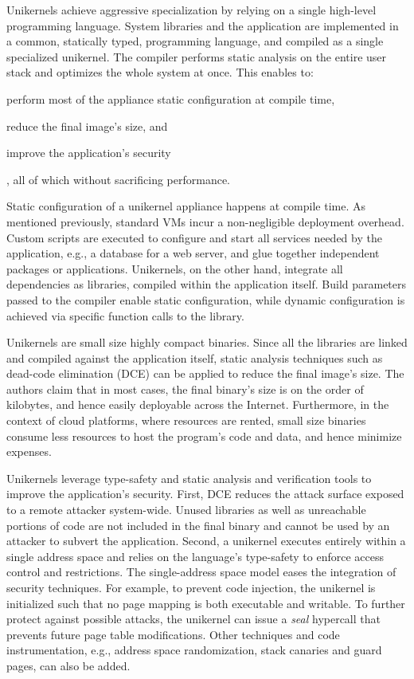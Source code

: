 Unikernels achieve aggressive specialization by relying on a single high-level programming language.
System libraries and the application are implemented in a common, statically typed, programming language, and compiled as a single specialized unikernel.
The compiler performs static analysis on the entire user stack and optimizes the whole system at once.
This enables to:
\begin{enumerate*}
	\item perform most of the appliance static configuration at compile time,
	\item reduce the final image's size, and
	\item improve the application's security
\end{enumerate*}, all of which without sacrificing performance.

Static configuration of a unikernel appliance happens at compile time.
As mentioned previously, standard VMs incur a non-negligible deployment overhead.
Custom scripts are executed to configure and start all services needed by the application, e.g., a database for a web server, and glue together independent packages or applications.
Unikernels, on the other hand, integrate all dependencies as libraries, compiled within the application itself.
Build parameters passed to the compiler enable static configuration, while dynamic configuration is achieved via specific function calls to the library.

Unikernels are small size highly compact binaries.
Since all the libraries are linked and compiled against the application itself, static analysis techniques such as dead-code elimination (DCE) can be applied to reduce the final image's size.
The authors claim that in most cases, the final binary's size is on the order of kilobytes, and hence easily deployable across the Internet.
Furthermore, in the context of cloud platforms, where resources are rented, small size binaries consume less resources to host the program's code and data, and hence minimize expenses.

Unikernels leverage type-safety and static analysis and verification tools to improve the application's security.
First, DCE reduces the attack surface exposed to a remote attacker system-wide.
Unused libraries as well as unreachable portions of code are not included in the final binary and cannot be used by an attacker to subvert the application.
Second, a unikernel executes entirely within a single address space and relies on the language's type-safety to enforce access control and restrictions.
The single-address space model eases the integration of security techniques. 
For example, to prevent code injection, the unikernel is initialized such that no page mapping is both executable and writable.
To further protect against possible attacks, the unikernel can issue a \emph{seal} hypercall that prevents future page table modifications.
Other techniques and code instrumentation, e.g., address space randomization, stack canaries and guard pages, can also be added.

